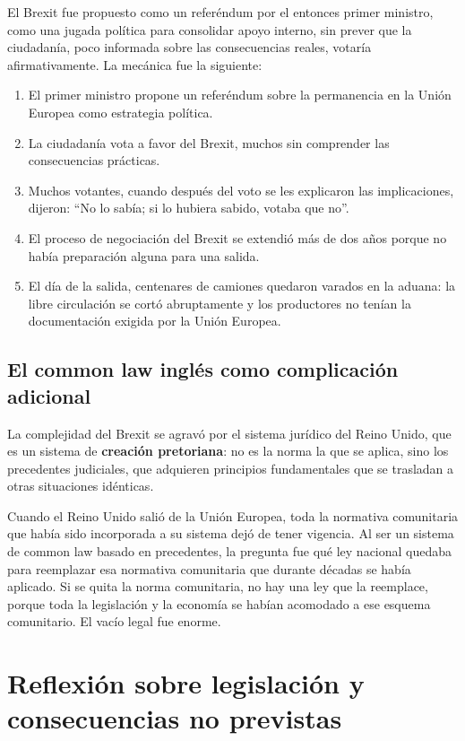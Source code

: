 \documentclass[12pt,oneside]{book}
\begin{document}
El Brexit fue propuesto como un referéndum por el entonces primer ministro, como una jugada política para consolidar apoyo interno, sin prever que la ciudadanía, poco informada sobre las consecuencias reales, votaría afirmativamente. La mecánica fue la siguiente:

\begin{enumerate}
    \item El primer ministro propone un referéndum sobre la permanencia en la Unión Europea como estrategia política.
    \item La ciudadanía vota a favor del Brexit, muchos sin comprender las consecuencias prácticas.
    \item Muchos votantes, cuando después del voto se les explicaron las implicaciones, dijeron: ``No lo sabía; si lo hubiera sabido, votaba que no''.
    \item El proceso de negociación del Brexit se extendió más de dos años porque no había preparación alguna para una salida.
    \item El día de la salida, centenares de camiones quedaron varados en la aduana: la libre circulación se cortó abruptamente y los productores no tenían la documentación exigida por la Unión Europea.
\end{enumerate}

\subsection{El common law inglés como complicación adicional}

La complejidad del Brexit se agravó por el sistema jurídico del Reino Unido, que es un sistema de \textbf{creación pretoriana}: no es la norma la que se aplica, sino los precedentes judiciales, que adquieren principios fundamentales que se trasladan a otras situaciones idénticas.

Cuando el Reino Unido salió de la Unión Europea, toda la normativa comunitaria que había sido incorporada a su sistema dejó de tener vigencia. Al ser un sistema de common law basado en precedentes, la pregunta fue qué ley nacional quedaba para reemplazar esa normativa comunitaria que durante décadas se había aplicado. Si se quita la norma comunitaria, no hay una ley que la reemplace, porque toda la legislación y la economía se habían acomodado a ese esquema comunitario. El vacío legal fue enorme.

\section{Reflexión sobre legislación y consecuencias no previstas}
\end{document}
